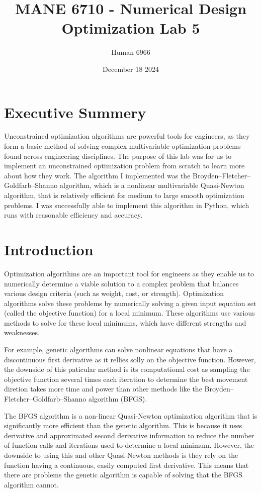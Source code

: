 \documentclass[11pt]{article}%
\title{MANE 6710 - Numerical Design Optimization Lab 5}
\author{Human 6966}
\date{December 18 2024}
\begin{document}
\maketitle
\newpage
\tableofcontents
\newpage
{}
\section*{Executive Summery}
\label{sec:abstract}

Unconstrained optimization algorithms are powerful tools for engineers, as they form a basic method of solving complex multivariable optimization problems found across engineering disciplines. The purpose of this lab was for us to implement  an unconstrained optimization problem from scratch to learn more about how they work. The algorithm I implemented was the Broyden–Fletcher–Goldfarb–Shanno algorithm, which is a nonlinear multivariable Quasi-Newton algorithm, that is relatively efficient for medium to large smooth optimization problems. I was successfully able to implement this algorithm in Python, which runs with reasonable efficiency and accuracy.

\section{Introduction}
\label{sec:intro}

Optimization algorithms are an important tool for engineers as they enable us to numerically determine a viable solution to a complex problem that balances various design criteria (such as weight, cost, or strength). Optimization algorithms  solve these problems by numerically solving a given input equation set (called the objective function) for a local minimum. These algorithms use various methods to solve for these local minimums, which have different strengths and weaknesses. 

For example, genetic algorithms can solve nonlinear equations that have a discontinuous first derivative as it rellies solly on the objective function. However, the downside of this paticular method is its computational cost as sampling the objective function several times each iteration to determine the best movement diretion takes more time and power than other methods like the Broyden–Fletcher–Goldfarb–Shanno algorithm (BFGS). 

The BFGS algorithm is a non-linear Quasi-Newton optimization algorithm that is significantly more efficient than the genetic algorithm. This is because it uses derivative and approximated second derivative information to reduce the number of function calls and iterations used to determine a local minimum. However, the downside to using this and other Quasi-Newton methods is they rely on the function having a continuous, easily computed first derivative. This means that there are problems the genetic algorithm is capable of solving that the BFGS algorithm cannot.
\end{document}
